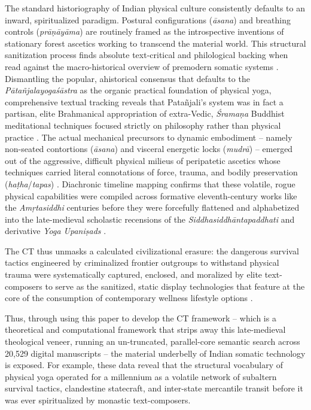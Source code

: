 \documentclass[11pt,twoside,letterpaper]{article}
\begin{document}
The standard historiography of Indian physical culture consistently defaults to an inward, spiritualized paradigm. Postural configurations (\textit{āsana}) and breathing controls (\textit{prāṇāyāma}) are routinely framed as the introspective inventions of stationary forest ascetics working to transcend the material world. This structural sanitization process finds absolute text-critical and philological backing when read against the macro-historical overview of premodern somatic systems \citep{Mallinson2017}. Dismantling the popular, ahistorical consensus that defaults to the \textit{Pātañjalayogaśāstra} as the organic practical foundation of physical yoga, comprehensive textual tracking reveals that Patañjali’s system was in fact a partisan, elite Brahmanical appropriation of extra-Vedic, \textit{Śramaṇa} Buddhist meditational techniques focused strictly on philosophy rather than physical practice \citep{Mallinson2017}. The actual mechanical precursors to dynamic embodiment – namely non-seated contortions (\textit{āsana}) and visceral energetic locks (\textit{mudrā}) – emerged out of the aggressive, difficult physical milieus of peripatetic ascetics whose techniques carried literal connotations of force, trauma, and bodily preservation (\textit{haṭha}/\textit{tapas}) \citep{Mallinson2017}. Diachronic timeline mapping confirms that these volatile, rogue physical capabilities were compiled across formative eleventh-century works like the \textit{Amṛtasiddhi} centuries before they were forcefully flattened and alphabetized into the late-medieval scholastic recensions of the \textit{Siddhasiddhāntapaddhati} and derivative \textit{Yoga Upaniṣads} \citep{Birch2024, Mallinson2017}.

The CT thus unmasks a calculated civilizational erasure: the dangerous survival tactics engineered by criminalized frontier outgroups to withstand physical trauma were systematically captured, enclosed, and moralized by elite text-composers to serve as the sanitized, static display technologies that feature at the core of the consumption of contemporary wellness lifestyle options \citep{Debnath2024, Mallinson2017, McCartney2021}.

Thus, through using this paper to develop the CT framework -- which is a theoretical and computational framework that strips away this late-medieval theological veneer, running an un-truncated, parallel-core semantic search across 20,529 digital manuscripts -- the material underbelly of Indian somatic technology is exposed. For example, these data reveal that the structural vocabulary of physical yoga operated for a millennium as a volatile network of subaltern survival tactics, clandestine statecraft, and inter-state mercantile transit before it was ever spiritualized by monastic text-composers.
\end{document}
